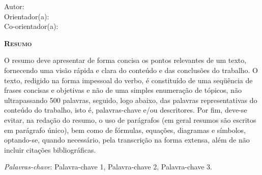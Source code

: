 \begin{center}
{\Large{\textbf{\thetitle}}}
\end{center}

\vspace{1cm}

\begin{flushright}
Autor: \theauthor\\
Orientador(a): \advisor\\
Co-orientador(a): \coadvisor
\end{flushright}

\vspace{1cm}

\begin{center}
	\Large{\textsc{\textbf{Resumo}}}
\end{center}

\noindent O resumo deve apresentar de forma concisa os pontos relevantes de um texto, fornecendo uma visão rápida e clara do conteúdo e das conclusões do trabalho. O texto, redigido na forma impessoal do verbo, é constituído de uma seqüência de frases concisas e objetivas e não de uma simples enumeração de tópicos, não ultrapassando 500 palavras, seguido, logo abaixo, das palavras representativas do conteúdo do trabalho, isto é, palavras-chave e/ou descritores. Por fim, deve-se evitar, na redação do resumo, o uso de parágrafos (em geral resumos são escritos em parágrafo único), bem como de fórmulas, equações, diagramas e símbolos, optando-se, quando necessário, pela transcrição na forma extensa, além de não incluir citações bibliográficas.
\vspace{\onelineskip}

\noindent\textit{Palavras-chave}: Palavra-chave 1, Palavra-chave 2, Palavra-chave 3.